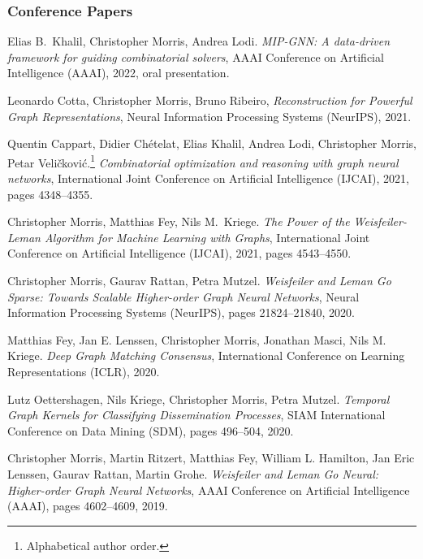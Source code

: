 \documentclass[11pt, a4paper, DIV=12]{scrartcl}
\begin{document}
\begin{thebibliography}{5}

\subsubsection*{Conference Papers}

	Elias B.\, Khalil, Christopher Morris, Andrea Lodi.
	\emph{MIP-GNN: A data-driven framework for guiding combinatorial solvers}, 
	 AAAI Conference on Artificial Intelligence (AAAI), 2022, oral presentation.
	


    Leonardo Cotta, Christopher Morris, Bruno Ribeiro,
	\emph{Reconstruction for Powerful Graph Representations},
	Neural Information Processing Systems (NeurIPS), 2021.	

	Quentin Cappart, Didier Chételat, Elias Khalil, Andrea Lodi, Christopher Morris, Petar Veli\v{c}kovi\'{c}.\footnote[1]{Alphabetical author order.}
	\emph{Combinatorial optimization and reasoning with graph neural networks},
    International Joint Conference on Artificial Intelligence (IJCAI), 2021, pages 4348--4355.

	Christopher Morris, Matthias Fey, Nils M.~Kriege.
	\emph{The Power of the Weisfeiler-Leman Algorithm for Machine Learning with Graphs},
	International Joint Conference on Artificial Intelligence (IJCAI), 2021, pages 4543--4550.

    Christopher Morris, Gaurav Rattan, Petra Mutzel.
	\emph{Weisfeiler and Leman Go Sparse: Towards Scalable Higher-order Graph Neural Networks},
	Neural Information Processing Systems (NeurIPS), pages 21824--21840, 2020.

	Matthias Fey, Jan E. Lenssen, Christopher Morris, Jonathan Masci, Nils M. Kriege.
    \emph{Deep Graph Matching Consensus},
	International Conference on Learning Representations (ICLR), 2020.
	
	Lutz Oettershagen, Nils Kriege, Christopher Morris, Petra Mutzel.
	\emph{Temporal Graph Kernels for Classifying Dissemination Processes},
	SIAM International Conference on Data Mining (SDM), pages 496--504, 2020.
	
	Christopher Morris, Martin Ritzert, Matthias Fey, William L. Hamilton, Jan Eric Lenssen, Gaurav Rattan, Martin Grohe.
	\newblock \emph{Weisfeiler and Leman Go Neural: Higher-order Graph Neural Networks},
	\newblock AAAI Conference on Artificial Intelligence (AAAI), pages 4602--4609, 2019.
	

\end{thebibliography}
\end{document}
